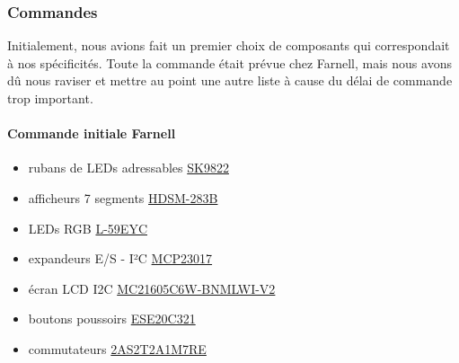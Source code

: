 \documentclass[12pt]{report}
\begin{document}
	\subsubsection{Commandes}
	Initialement, nous avions fait un premier choix de composants qui correspondait à nos spécificités. Toute la commande était prévue chez Farnell, mais nous avons dû nous raviser et mettre au point une autre liste à cause du délai de commande trop important.\\
	\paragraph{Commande initiale Farnell}
	\begin{itemize}[label=$-$]
		\item rubans de LEDs adressables \href{https://fr.aliexpress.com/item/1005006918408592.html?spm=a2g0o.productlist.main.19.fbb0788296kxRo&algo_pvid=72d2c9a9-ec47-4e4b-9d14-7e90be35485c&algo_exp_id=72d2c9a9-ec47-4e4b-9d14-7e90be35485c-9&pdp_npi=4%40dis!EUR!18.92!18.92!!!145.68!145.68!%402103888a17169934968957029e0b2f!12000038723750387!sea!FR!0!AB&curPageLogUid=lAauznpLAY1Y&utparam-url=scene%3Asearch%7Cquery_from%3A}{SK9822}
		\item afficheurs 7 segments \href{https://fr.farnell.com/broadcom-limited/hdsm-283b/afficheur-a-led-cms-7mm-bleu-cc/dp/1659312}{HDSM-283B}
		\item LEDs RGB \href{https://fr.farnell.com/kingbright/l-59eyc/led-5mm-tricolore/dp/1168662}{L-59EYC}
		\item expandeurs E/S - I²C \href{https://fr.farnell.com/microchip/mcp23017-e-sp/16-bit-expander-i-o-i2c-i-f/dp/1332088}{MCP23017}
		\item écran LCD I2C \href{https://fr.farnell.com/midas/mc21605c6w-bnmlwi-v2/afficheur-alphanumerique-16x2/dp/2748649}{MC21605C6W-BNMLWI-V2}
		\item boutons poussoirs \href{https://fr.farnell.com/panasonic/ese20c321/commutateur-bouton-pouss-momentane/dp/2079613}{ESE20C321}
		\item commutateurs \href{https://fr.farnell.com/multicomp/2as2t2a1m7re/switch-toggle-spdt-on-mom/dp/1550118}{2AS2T2A1M7RE}
	\end{itemize}
\end{document}
